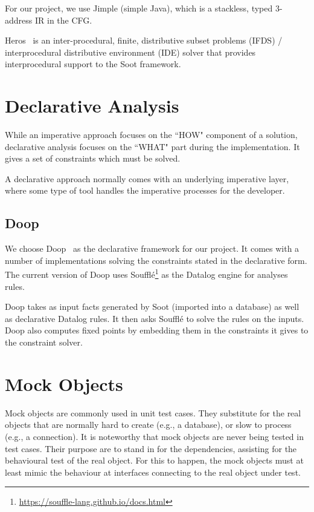 For our project, we use Jimple (simple Java), which is a stackless, typed 3-address IR in the CFG.

Heros~\cite{bodden12:_inter_proced_data_flow_analy} is an inter-procedural, finite, distributive subset problems (IFDS) / interprocedural distributive environment (IDE) solver that provides interprocedural support to the Soot framework.

\section{Declarative Analysis}

While an imperative approach focuses on the ``HOW" component of a solution, declarative analysis focuses on the ``WHAT" part during the implementation. It gives a set of constraints which must be solved.

A declarative approach normally comes with an underlying imperative layer, where some type of tool handles the imperative processes for the developer.

\subsection{Doop}

We choose Doop~\cite{bravenboer09:_stric_declar_specif_sophis_point_analy} as the declarative framework for our project. It comes with a number of implementations solving the constraints stated in the declarative form. The current version of Doop uses Soufflé\footnote{\url{https://souffle-lang.github.io/docs.html}} as the Datalog engine for analyses rules.

Doop takes as input facts generated by Soot (imported into a database) as well as declarative Datalog rules. It then asks Soufflé to solve the rules on the inputs. Doop also computes fixed points by embedding them in the constraints it gives to the constraint solver.


\section{Mock Objects} 

Mock objects are commonly used in unit test cases. They substitute for the real objects that are normally hard to create (e.g., a database), or slow to process (e.g., a connection). It is noteworthy that mock objects are never being tested in test cases. Their purpose are to stand in for the dependencies, assisting for the behavioural test of the real object. For this to happen, the mock objects must at least mimic the behaviour at interfaces connecting to the real object under test.

